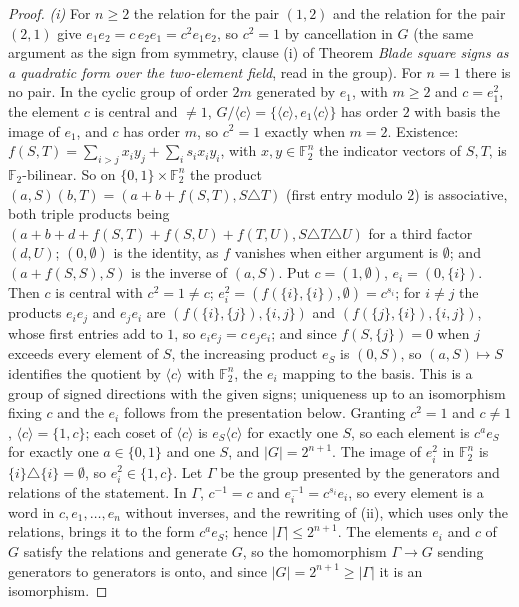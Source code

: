\documentclass[11pt]{article}
\theoremstyle{definition}
\theoremstyle{plain}
\begin{document}
\begin{proof}
\emph{(i)} For $n \ge 2$ the relation for the pair $(1, 2)$ and the relation for the pair $(2, 1)$ give $e_{1}e_{2} = c\,e_{2}e_{1} = c^{2}e_{1}e_{2}$, so $c^{2} = 1$ by cancellation in $G$ (the same argument as the sign from symmetry, clause (i) of Theorem \emph{Blade square signs as a quadratic form over the two-element field}, read in the group). For $n = 1$ there is no pair. In the cyclic group of order $2m$ generated by $e_{1}$, with $m \ge 2$ and $c = e_{1}^{2}$, the element $c$ is central and $\ne 1$, $G/\langle c\rangle = \{\langle c\rangle, e_{1}\langle c\rangle\}$ has order $2$ with basis the image of $e_{1}$, and $c$ has order $m$, so $c^{2} = 1$ exactly when $m = 2$. Existence: $f(S,T) = \sum_{i > j}x_{i}y_{j} + \sum_{i}s_{i}x_{i}y_{i}$, with $x, y \in \mathbb{F}_{2}^{n}$ the indicator vectors of $S, T$, is $\mathbb{F}_{2}$-bilinear. So on $\{0, 1\} \times \mathbb{F}_{2}^{n}$ the product $(a, S)(b, T) = (a + b + f(S,T), S \triangle T)$ (first entry modulo $2$) is associative, both triple products being $(a + b + d + f(S,T) + f(S,U) + f(T,U), S \triangle T \triangle U)$ for a third factor $(d, U)$; $(0, \emptyset)$ is the identity, as $f$ vanishes when either argument is $\emptyset$; and $(a + f(S,S), S)$ is the inverse of $(a, S)$. Put $c = (1, \emptyset)$, $e_{i} = (0, \{i\})$. Then $c$ is central with $c^{2} = 1 \ne c$; $e_{i}^{2} = (f(\{i\}, \{i\}), \emptyset) = c^{s_{i}}$; for $i \ne j$ the products $e_{i}e_{j}$ and $e_{j}e_{i}$ are $(f(\{i\},\{j\}), \{i, j\})$ and $(f(\{j\},\{i\}), \{i, j\})$, whose first entries add to $1$, so $e_{i}e_{j} = c\,e_{j}e_{i}$; and since $f(S, \{j\}) = 0$ when $j$ exceeds every element of $S$, the increasing product $e_{S}$ is $(0, S)$, so $(a, S) \mapsto S$ identifies the quotient by $\langle c\rangle$ with $\mathbb{F}_{2}^{n}$, the $e_{i}$ mapping to the basis. This is a group of signed directions with the given signs; uniqueness up to an isomorphism fixing $c$ and the $e_{i}$ follows from the presentation below. Granting $c^{2} = 1$ and $c \ne 1$, $\langle c\rangle = \{1, c\}$; each coset of $\langle c\rangle$ is $e_{S}\langle c\rangle$ for exactly one $S$, so each element is $c^{a}e_{S}$ for exactly one $a \in \{0, 1\}$ and one $S$, and $|G| = 2^{n+1}$. The image of $e_{i}^{2}$ in $\mathbb{F}_{2}^{n}$ is $\{i\} \triangle \{i\} = \emptyset$, so $e_{i}^{2} \in \{1, c\}$. Let $\Gamma$ be the group presented by the generators and relations of the statement. In $\Gamma$, $c^{-1} = c$ and $e_{i}^{-1} = c^{s_{i}}e_{i}$, so every element is a word in $c, e_{1}, \dots, e_{n}$ without inverses, and the rewriting of (ii), which uses only the relations, brings it to the form $c^{a}e_{S}$; hence $|\Gamma| \le 2^{n+1}$. The elements $e_{i}$ and $c$ of $G$ satisfy the relations and generate $G$, so the homomorphism $\Gamma \to G$ sending generators to generators is onto, and since $|G| = 2^{n+1} \ge |\Gamma|$ it is an isomorphism.


\end{proof}
\end{document}
